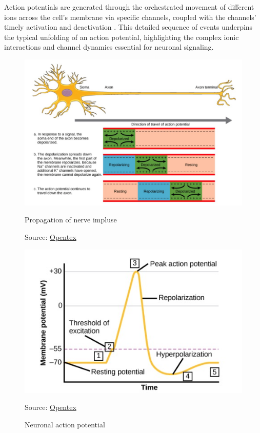 \documentclass[12pt,a4paper]{report}
\begin{document}
Action potentials are generated through the orchestrated movement of different ions across the cell's membrane via specific channels, coupled with the channels' timely activation and deactivation \cite{MysteriesOfTheActionPotential}. This detailed sequence of events underpins the typical unfolding of an action potential, highlighting the complex ionic interactions and channel dynamics essential for neuronal signaling.
\begin{figure}[H]
    \centering
    \begin{minipage}[b]{0.45\textwidth}
      \centering
      \includegraphics[width=\textwidth]{./data/propagation-of-nerve-impluse.jpg}
      \caption{Propagation of nerve impluse}
      \label{fig:exampleA}
      \vspace{1pt} %
      \small{Source: \href{https://opentextbc.ca/biology/chapter/16-2-how-neurons-communicate/}{Opentex}}
    \end{minipage}
    \hfill
    \begin{minipage}[b]{0.45\textwidth}
      \centering
      \includegraphics[width=\textwidth]{./data/neuronal-action-potential.jpg}
      \caption{Neuronal action potential}
      \label{fig:exampleB}
      \vspace{1pt} %
      \small{Source: \href{https://opentextbc.ca/biology/chapter/16-2-how-neurons-communicate/}{Opentex}}
    \end{minipage}
\end{figure}
\end{document}
